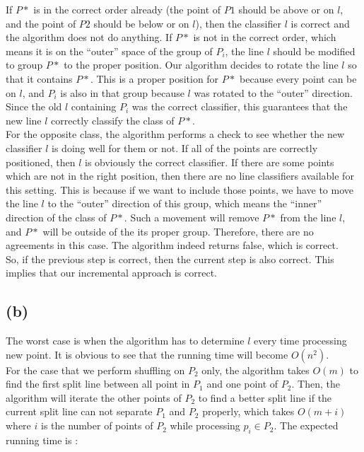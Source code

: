 If $P*$ is in the correct order already (the point of $P1$ should be above or on $l$, and the point of $P2$ should be below or on $l$), then the classifier $l$ is correct and
the algorithm does not do anything. If $P*$ is not in the correct order, which means it is on the ``outer'' space of the group of $P_i$, the line $l$ should be modified to group $P*$ to the proper position. Our algorithm decides to rotate the line $l$ so that it contains $P*$. This is a proper position for $P*$ because every point can be on $l$, and $P_i$ is also in that group because $l$ was rotated to the ``outer'' direction. Since the old $l$ containing $P_i$ was the correct classifier, this guarantees that the new line $l$ correctly classify the class of $P*$. \\ 

For the opposite class, the algorithm performs a check to see whether the new classifier $l$ is doing well for them or not. If all of the points are correctly positioned, then $l$ is obviously the correct classifier. If there are some points which are not in the right position, then there are no line classifiers available for this setting. This is because if we want to include those points, we have to move the line $l$ to the ``outer'' direction of this group, which means the ``inner'' direction of the class of $P*$. Such a movement will remove $P*$ from the line $l$, and $P*$ will be outside of the its proper group. Therefore, there are no agreements in this case. The algorithm indeed returns false, which is correct. \\

So, if the previous step is correct, then the current step is also correct. This implies that our incremental approach is correct. \\


\subsection*{(b)}
The worst case is when the algorithm has to determine $l$ every time processing
new point. It is obvious to see that the running time will become $O(n^2)$. \\

For the case that we perform shuffling on $P_2$ only, the algorithm takes $O(m)$
to find the first split line between all point in $P_1$ and one point of $P_2$.
Then, the algorithm will iterate the other points of $P_2$ to find a better split
line if the current split line can not separate $P_1$ and $P_2$ properly, which
takes $O(m+i)$ where $i$ is the number of points of $P_2$ while processing $p_i
\in P_2$. The expected running time is :

